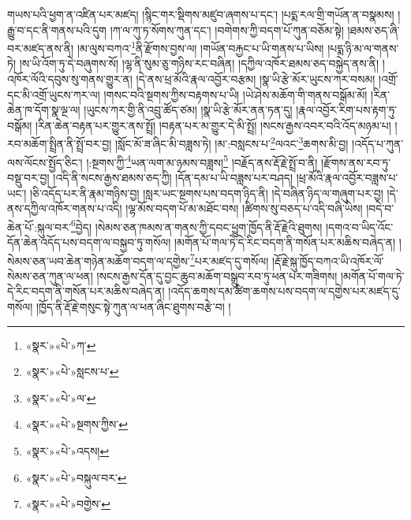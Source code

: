 གཡས་པའི་ཕྱག་ན་འཛིན་པར་མཛད། །སྙིང་གར་སྡིགས་མཛུབ་ཞགས་པ་དང་། །པདྨ་རལ་གྲི་གཡོན་ན་བསྣམས། །རྒྱུ་བ་དང་ནི་གནས་པའི་དུག །ཀ་ལ་ཀུ་ཏ་སོགས་ཀུན་དང་། །བགེགས་ཀྱི་བདག་པོ་ཀུན་བཅོམ་སྟེ། །ཐམས་ཅད་ཞི་བར་མཛད་ནས་ནི། །མ་ལུས་བཀའ་\footnote{«སྣར་»«པེ་»ཀ་}ནི་རྫོགས་བྱས་ལ། །གཡོན་བརྐྱང་པ་ཡི་གནས་པ་ཡིས། །པདྨ་ཉི་མ་ལ་གནས་ཏེ། །ས་ཡི་འོག་ཏུ་དེ་བཞུགས་སོ། །ལྷ་ནི་སུམ་ཅུ་གཉིས་རང་བཞིན། །དཀྱིལ་འཁོར་ཐམས་ཅད་བསྐྱེད་ནས་ནི། །འཁོར་ལོའི་དབུས་སུ་གནས་གྱུར་ན། །དེ་ནས་ཕྲ་མོའི་རྣལ་འབྱོར་བརྩམ། །སྣ་ཡི་རྩེ་མོར་ཡུངས་ཀར་བསམ། །འགྲོ་དང་མི་འགྲོ་ཡུངས་ཀར་ལ། །གསང་བའི་སྔགས་ཀྱིས་བརྟགས་པ་ཡི། །ཡེ་ཤེས་མཆོག་གི་གནས་བསྒོམ་མོ། །རིན་ཆེན་ཁ་དོག་སྣ་ལྔ་ལ། །ཡུངས་ཀར་གྱི་ནི་འབྲུ་ཚོད་ཙམ། །སྣ་ཡི་རྩེ་མོར་ནན་ཏན་དུ། །རྣལ་འབྱོར་རིག་པས་རྟག་ཏུ་བསྒོམ། །རིན་ཆེན་བརྟན་པར་གྱུར་ནས་སྤྲོ། །བརྟན་པར་མ་གྱུར་དེ་མི་སྤྲོ། །སངས་རྒྱས་འབར་བའི་འོད་མཉམ་པ། །རབ་མཆོག་སྤྲིན་ནི་སྤྲོ་བར་བྱ། །སློང་མོ་ཟ་ཞིང་མི་བཟླས་ཏེ། །མ་:བསླངས་པ་\footnote{«སྣར་»«པེ་»སླངས་པ་}ལའང་\footnote{«སྣར་»«པེ་»ལ་}ཆགས་མི་བྱ། །འདོད་པ་ཀུན་ལས་ལོངས་སྤྱོད་ཅིང་། །:སྔགས་ཀྱི་\footnote{«སྣར་»«པེ་»སྔགས་ཀྱིས་}ཡན་ལག་མ་ཉམས་བཟླས།\footnote{«སྣར་»«པེ་»འདས།} །བརྗོད་ནས་རྡོ་རྗེ་སྤྲོ་བ་ནི། །རྫོགས་ནས་རབ་ཏུ་བསྡུ་བར་བྱ། །འདི་ནི་སངས་རྒྱས་ཐམས་ཅད་ཀྱི། །དོན་དམ་པ་ཡི་བཟླས་པར་བཤད། །ཕྲ་མོའི་རྣལ་འབྱོར་བཟླས་པ་ཡང་། །ཅི་འདོད་པར་ནི་རྣམ་གཉིས་བྱ། །སླར་ཡང་སྔགས་པས་བདག་ཉིད་ནི། །དེ་བཞིན་ཉིད་ལ་གཞུག་པར་བྱ། །དེ་ནས་དཀྱིལ་འཁོར་གནས་པ་འདི། །ལྷ་མོས་བདག་པོ་མ་མཐོང་བས། །ཚིགས་སུ་བཅད་པ་འདི་བཞི་ཡིས། །བདེ་བ་ཆེན་པོ་:སྐུལ་བར་\footnote{«སྣར་»«པེ་»བསྐུལ་བར་}བྱེད། །སེམས་ཅན་ཁམས་ན་གནས་ཀྱི་དབང་ཕྱུག་ཁྱོད་ནི་རྡོ་རྗེའི་ཐུགས། །དགའ་བ་ཡིད་འོང་དོན་ཆེན་འདོད་པས་བདག་ལ་བསྐྱབ་ཏུ་གསོལ། །མགོན་པོ་གལ་ཏེ་དེ་རིང་བདག་ནི་གསོན་པར་མཆིས་བཞེད་ན། །སེམས་ཅན་ཡབ་ཆེན་གཉེན་མཆོག་བདག་ལ་དགྱེས་\footnote{«སྣར་»«པེ་»བགྱེས་}པར་མཛད་དུ་གསོལ། །རྡོ་རྗེ་སྐུ་ཁྱོད་བཀའ་ཡི་འཁོར་ལོ་སེམས་ཅན་ཀུན་ལ་ཕན། །སངས་རྒྱས་དོན་དུ་བྱང་ཆུབ་མཆོག་བསྒྲུབ་རབ་ཏུ་ཕན་པར་གཟིགས། །མགོན་པོ་གལ་ཏེ་དེ་རིང་བདག་ནི་གསོན་པར་མཆིས་བཞེད་ན། །འདོད་ཆགས་དམ་ཚིག་ཆགས་པས་བདག་ལ་དགྱེས་པར་མཛད་དུ་གསོལ། །ཁྱོད་ནི་རྡོ་རྗེ་གསུང་སྟེ་ཀུན་ལ་ཕན་ཞིང་ཐུགས་བརྩེ་བ། །
